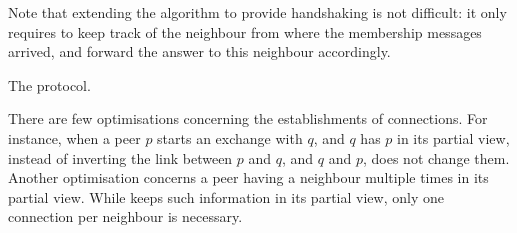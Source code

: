 Note that extending the algorithm to provide handshaking is not difficult: it
only requires to keep track of the neighbour from where the membership messages
arrived, and forward the answer to this neighbour accordingly.

\begin{algorithm}
  
  \caption{\label{algo:scamplon}The \SCAMPLON{} protocol.}
\end{algorithm}

There are few optimisations concerning the establishments of connections. For
instance, when a peer $p$ starts an exchange with $q$, and $q$ has $p$ in its
partial view, instead of inverting the link between $p$ and $q$, and $q$ and
$p$, \SCAMPLON{} does not change them. Another optimisation concerns a peer
having a neighbour multiple times in its partial view. While \SCAMPLON{} keeps
such information in its partial view, only one connection per neighbour is
necessary.


